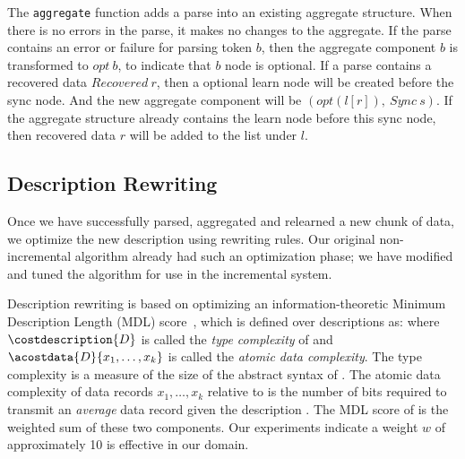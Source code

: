 {The {\tt aggregate} function adds a parse into an existing aggregate structure. When there is
no errors in the parse, it makes no changes to the aggregate. If the parse contains 
an error or failure for parsing token $b$, then the aggregate component 
$b$ is transformed to $opt~ b$, to indicate that $b$ node is optional. 
If a parse contains a recovered data $Recovered~ r$, then
a optional learn node will be created before the sync node. And the new aggregate component will be
$(opt (l [r]),~ Sync~ s)$. If the aggregate structure already contains the learn node before this
sync node, then recovered data $r$ will be added to the list under $l$.


}%



\subsection{Description Rewriting}
Once we have successfully parsed, aggregated and relearned a new
chunk of data, we optimize the new description using rewriting rules.  
Our original non-incremental
algorithm already had such an optimization
phase; we have modified and tuned the algorithm for use in
the incremental system.

Description rewriting is based on optimizing an information-theoretic
Minimum Description Length (MDL) score~\cite{mdlbook}, which is defined over descriptions
 as:
where $\costdescription{D}$ is called the {\em type complexity} of 
and $\acostdata{D}{x_1, \ldots, x_k}$ is called the {\em atomic data 
complexity}.  The type complexity is a measure of the size of the 
abstract syntax of .  The atomic data 
complexity of data records $x_1, \ldots, x_k$ relative to  
is the number of bits required
to transmit an {\em average} data record given the description .
The MDL score of  is the weighted sum of these two components.  
Our experiments indicate a weight $w$ of approximately 10 is effective
in our domain.

